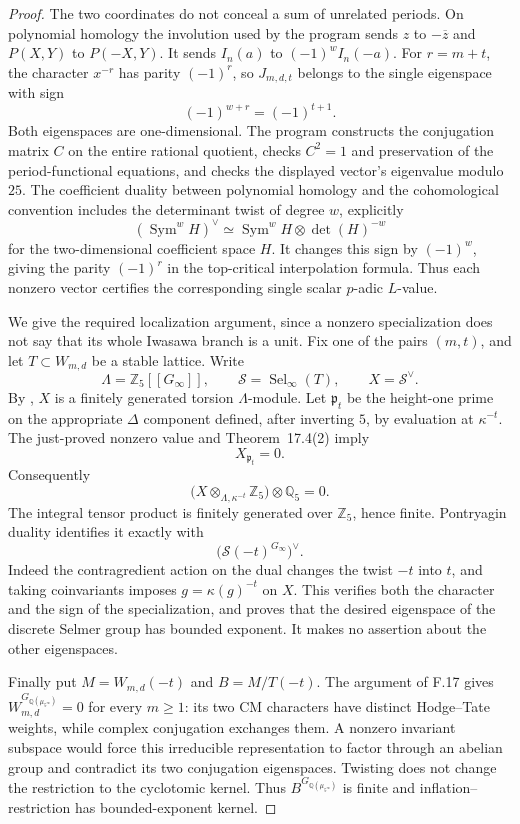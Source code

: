 \begin{proof}
The two coordinates do not conceal a sum of unrelated
periods. On polynomial homology the involution used by the
program sends $z$ to $-\overline z$ and $P(X,Y)$ to
$P(-X,Y)$. It sends $I_n(a)$ to $(-1)^wI_n(-a)$.
For $r=m+t$, the character $x^{-r}$ has parity $(-1)^r$,
so $J_{m,d,t}$ belongs to the single eigenspace with sign
\[
 (-1)^{w+r}=(-1)^{t+1}.
\]
Both eigenspaces are one-dimensional. The program constructs
the conjugation matrix $C$ on the entire rational quotient,
checks $C^2=1$ and preservation of the period-functional
equations, and checks the displayed vector's eigenvalue
modulo $25$. The coefficient duality between polynomial
homology and the cohomological convention includes the
determinant twist of degree $w$, explicitly
\[
 (\operatorname{Sym}^w H)^\vee
     \simeq\operatorname{Sym}^w H\otimes\det(H)^{-w}
\]
for the two-dimensional coefficient space $H$.
It changes this sign by
$(-1)^w$, giving the parity $(-1)^r$ in the top-critical
interpolation formula. Thus each nonzero vector certifies
the corresponding single scalar $p$-adic $L$-value.

We give the required localization argument, since a nonzero
specialization does not say that its whole Iwasawa branch
is a unit. Fix one of the pairs $(m,t)$, and let
$T\subset W_{m,d}$ be a stable lattice. Write
\[
 \Lambda=\mathbb Z_5[[G_\infty]],\qquad
 \mathcal S=\operatorname{Sel}_\infty(T),\qquad
 X=\mathcal S^\vee.
\]
By \citet[\S17.3 and Theorem~17.4(1)]{FA_Kato2004},
$X$ is a finitely generated torsion $\Lambda$-module.
Let $\mathfrak p_t$ be the height-one prime on the appropriate
$\Delta$ component defined, after inverting $5$, by evaluation
at $\kappa^{-t}$. The just-proved nonzero value and
Theorem~17.4(2) imply
\[
 X_{\mathfrak p_t}=0.
\]
Consequently
\[
 \bigl(X\otimes_{\Lambda,\kappa^{-t}}\mathbb Z_5\bigr)
          \otimes\mathbb Q_5=0.
\]
The integral tensor product is finitely generated over
$\mathbb Z_5$, hence finite. Pontryagin duality identifies it
exactly with
\[
 \bigl(\mathcal S(-t)^{G_\infty}\bigr)^\vee.
\]
Indeed the contragredient action on the dual changes the
twist $-t$ into $t$, and taking coinvariants imposes
$g=\kappa(g)^{-t}$ on $X$. This verifies both the character
and the sign of the specialization, and proves that the
desired eigenspace of the discrete Selmer group has bounded
exponent. It makes no assertion about the other eigenspaces.

Finally put $M=W_{m,d}(-t)$ and $B=M/T(-t)$.
The argument of F.17 gives
$W_{m,d}^{G_{\mathbb Q(\mu_{5^\infty})}}=0$ for every
$m\ge1$: its two CM characters have distinct Hodge--Tate
weights, while complex conjugation exchanges them. A
nonzero invariant subspace would force this irreducible
representation to factor through an abelian group and
contradict its two conjugation eigenspaces. Twisting does
not change the restriction to the cyclotomic kernel.
Thus $B^{G_{\mathbb Q(\mu_{5^\infty})}}$ is finite and
inflation--restriction has bounded-exponent kernel.


\end{proof}
